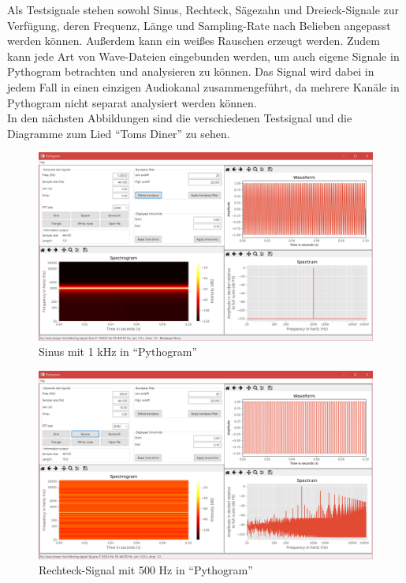\documentclass[a4paper]{article}
\begin{document}
Als Testsignale stehen sowohl Sinus, Rechteck, Sägezahn und Dreieck-Signale zur Verfügung, deren Frequenz, Länge und Sampling-Rate nach Belieben angepasst werden können. Außerdem kann ein weißes Rauschen erzeugt werden. Zudem kann jede Art von Wave-Dateien eingebunden werden, um auch eigene Signale in Pythogram betrachten und analysieren zu können. Das Signal wird dabei in jedem Fall in einen einzigen Audiokanal zusammengeführt, da mehrere Kanäle in Pythogram nicht separat analysiert werden können.\vspace{1em}\\
In den nächsten Abbildungen sind die verschiedenen Testsignal und die Diagramme zum Lied "`Toms Diner"' zu sehen.
\vspace{2em}
\begin{figure}[H]
    \centering
    \begin{minipage}{1.0\textwidth}
        \centering
        \includegraphics[width=1.0\textwidth]{Sine_1kHz.png}
        \caption{Sinus mit 1 kHz in "`Pythogram"'}
    \end{minipage}
\end{figure}
\begin{figure}[H]
    \centering
    \begin{minipage}{1.0\textwidth}
        \centering
        \includegraphics[width=1.0\textwidth]{Square_500Hz.png}
        \caption{Rechteck-Signal mit 500 Hz in "`Pythogram"'}
    \end{minipage}
\end{figure}
\end{document}
